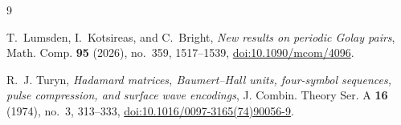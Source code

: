 \documentclass[11pt]{amsart}
\begin{document}
\begin{thebibliography}{9}

T.~Lumsden, I.~Kotsireas, and C.~Bright,
\emph{New results on periodic Golay pairs},
Math. Comp. \textbf{95} (2026), no.~359, 1517--1539,
\href{https://doi.org/10.1090/mcom/4096}
{doi:10.1090/mcom/4096}.

R.~J. Turyn,
\emph{Hadamard matrices, Baumert--Hall units, four-symbol sequences,
pulse compression, and surface wave encodings},
J. Combin. Theory Ser. A \textbf{16} (1974), no.~3, 313--333,
\href{https://doi.org/10.1016/0097-3165(74)90056-9}
{doi:10.1016/0097-3165(74)90056-9}.

\end{thebibliography}
\end{document}
